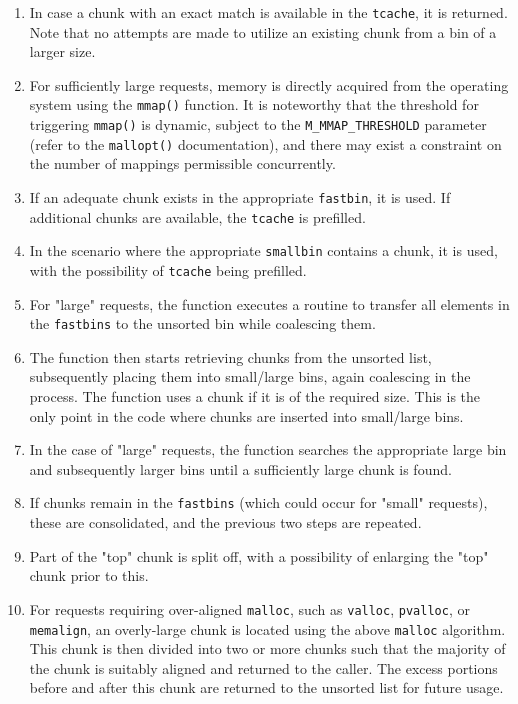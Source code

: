 \documentclass{article}
\begin{document}
\begin{enumerate}
\item In case a chunk with an exact match is available in the \texttt{tcache},
it is returned. Note that no attempts are made to utilize an existing chunk from
a bin of a larger size.

\item For sufficiently large requests, memory is directly acquired from the
operating system using the \texttt{mmap()} function. It is noteworthy that the
threshold for triggering \texttt{mmap()} is dynamic, subject to the
\texttt{M\_MMAP\_THRESHOLD} parameter (refer to the \texttt{mallopt()}
documentation), and there may exist a constraint on the number of mappings
permissible concurrently.

\item If an adequate chunk exists in the appropriate \texttt{fastbin}, it is
used. If additional chunks are available, the \texttt{tcache} is prefilled.

\item In the scenario where the appropriate \texttt{smallbin} contains a chunk,
it is used, with the possibility of \texttt{tcache} being prefilled.

\item For "large" requests, the function executes a routine to transfer all
elements in the \texttt{fastbins} to the unsorted bin while coalescing them.

\item The function then starts retrieving chunks from the unsorted list,
subsequently placing them into small/large bins, again coalescing in the
process. The function uses a chunk if it is of the required size. This is the
only point in the code where chunks are inserted into small/large bins.

\item In the case of "large" requests, the function searches the appropriate
large bin and subsequently larger bins until a sufficiently large chunk is
found.

\item If chunks remain in the \texttt{fastbins} (which could occur for "small"
requests), these are consolidated, and the previous two steps are repeated.

\item Part of the "top" chunk is split off, with a possibility of enlarging the
"top" chunk prior to this.

\item For requests requiring over-aligned \texttt{malloc}, such as
\texttt{valloc}, \texttt{pvalloc}, or \texttt{memalign}, an overly-large chunk
is located using the above \texttt{malloc} algorithm. This chunk is then divided
into two or more chunks such that the majority of the chunk is suitably aligned
and returned to the caller. The excess portions before and after this chunk are
returned to the unsorted list for future usage.
\end{enumerate}
\end{document}
